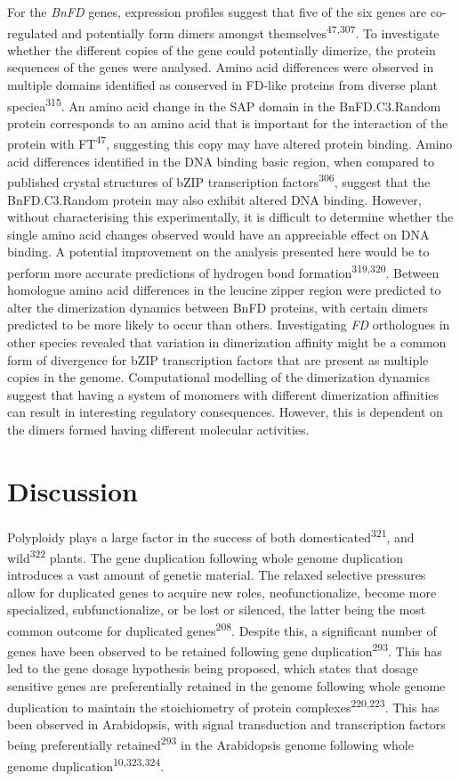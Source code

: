 \documentclass[12pt,]{book}
\begin{document}
For the \emph{BnFD} genes, expression profiles suggest that five of the
six genes are co-regulated and potentially form dimers amongst
themselves\textsuperscript{47,307}. To investigate whether the different
copies of the gene could potentially dimerize, the protein sequences of
the genes were analysed. Amino acid differences were observed in
multiple domains identified as conserved in FD-like proteins from
diverse plant speciea\textsuperscript{315}. An amino acid change in the
SAP domain in the BnFD.C3.Random protein corresponds to an amino acid
that is important for the interaction of the protein with
FT\textsuperscript{47}, suggesting this copy may have altered protein
binding. Amino acid differences identified in the DNA binding basic
region, when compared to published crystal structures of bZIP
transcription factors\textsuperscript{306}, suggest that the
BnFD.C3.Random protein may also exhibit altered DNA binding. However,
without characterising this experimentally, it is difficult to determine
whether the single amino acid changes observed would have an appreciable
effect on DNA binding. A potential improvement on the analysis presented
here would be to perform more accurate predictions of hydrogen bond
formation\textsuperscript{319,320}. Between homologue amino acid
differences in the leucine zipper region were predicted to alter the
dimerization dynamics between BnFD proteins, with certain dimers
predicted to be more likely to occur than others. Investigating
\emph{FD} orthologues in other species revealed that variation in
dimerization affinity might be a common form of divergence for bZIP
transcription factors that are present as multiple copies in the genome.
Computational modelling of the dimerization dynamics suggest that having
a system of monomers with different dimerization affinities can result
in interesting regulatory consequences. However, this is dependent on
the dimers formed having different molecular activities.

\section{Discussion}\label{discussion}

Polyploidy plays a large factor in the success of both
domesticated\textsuperscript{321}, and wild\textsuperscript{322} plants.
The gene duplication following whole genome duplication introduces a
vast amount of genetic material. The relaxed selective pressures allow
for duplicated genes to acquire new roles, neofunctionalize, become more
specialized, subfunctionalize, or be lost or silenced, the latter being
the most common outcome for duplicated genes\textsuperscript{208}.
Despite this, a significant number of genes have been observed to be
retained following gene duplication\textsuperscript{293}. This has led
to the gene dosage hypothesis being proposed, which states that dosage
sensitive genes are preferentially retained in the genome following
whole genome duplication to maintain the stoichiometry of protein
complexes\textsuperscript{220,223}. This has been observed in
Arabidopsis, with signal transduction and transcription factors being
preferentially retained\textsuperscript{293} in the Arabidopsis genome
following whole genome duplication\textsuperscript{10,323,324}.
\end{document}
